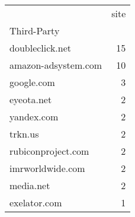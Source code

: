 \begin{tabular}{lr}
 & site \\
Third-Party &  \\
doubleclick.net & 15 \\
amazon-adsystem.com & 10 \\
google.com & 3 \\
eyeota.net & 2 \\
yandex.com & 2 \\
trkn.us & 2 \\
rubiconproject.com & 2 \\
imrworldwide.com & 2 \\
media.net & 2 \\
exelator.com & 1 \\
\end{tabular}
